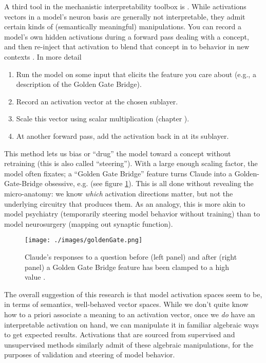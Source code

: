 A third tool in the mechanistic interpretability toolbox is
. While activations vectors in a model's neuron
basis are generally not interpretable, they admit certain kinds of
(semantically meaningful) manipulations. You can record a model's own hidden
activations during a forward pass dealing with a concept, and then re-inject
that activation to blend that concept in to behavior in new contexts
\cite{turner2024activation,zou2025representation}. In more detail

\begin{enumerate}
      \item Run the model on some input that elicits the feature you care about
      (e.g., a description of the Golden Gate Bridge).
      \item Record an activation vector at the chosen sublayer.
      \item Scale this vector using scalar multiplication (chapter
      ).
      \item At another forward pass, add the activation back in at its
      sublayer.
 \end{enumerate}
 
 This method lets us bias or “drug” the model toward a concept without
 retraining (this is also called ``steering''). With a large enough scaling
 factor, the model often fixates; a ``Golden Gate Bridge'' feature turns Claude
 into a Golden-Gate-Bridge obsessive, e.g. (see figure \ref{goldenGate}). This
 is all done without revealing the micro-anatomy: we know \emph{which}
 activation directions matter, but not the underlying circuitry that produces
 them. As an analogy, this is more akin to model psychiatry (temporarily
 steering model behavior without training) than to model neurosurgery (mapping
 out synaptic function).
 
\begin{figure}[ht]
\centering
\texttt{[image: ./images/goldenGate.png]}
\caption[Figure from \cite{templeton2024scaling}]{ Claude's responses to a
question before (left panel) and after (right panel) a Golden Gate Bridge
feature has been clamped to a high value \cite{templeton2024scaling}. }
\label{goldenGate}
\end{figure}

The overall suggestion of this research is
that model activation spaces seem to be, in terms of semantics, well-behaved
vector spaces. While we don't quite know how to a priori associate a meaning to
an activation vector, once we \emph{do} have an interpretable activation on
hand, we can manipulate it in familiar algebraic ways to get expected results.
Activations that are sourced from supervised and unsupervised methods similarly
admit of these algebraic manipulations, for the purposes of validation and
steering of model behavior.

